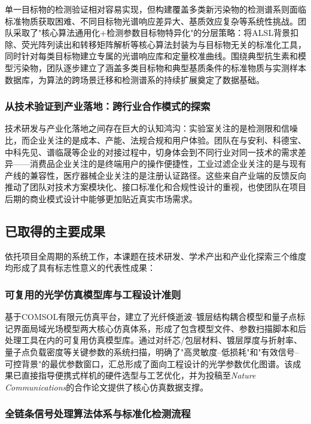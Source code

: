 \documentclass[12pt,a4paper]{article}
\begin{document}
单一目标物的检测验证相对容易实现，但构建覆盖多类新污染物的检测谱系则面临标准物质获取困难、不同目标物光谱响应差异大、基质效应复杂等系统性挑战。团队采取了"核心算法通用化+检测参数目标物特异化"的分层策略：将ALSL背景扣除、荧光阵列读出和转移矩阵解析等核心算法封装为与目标物无关的标准化工具，同时针对每类目标物建立专属的光谱响应库和定量校准曲线。围绕典型抗生素和模型污染物，团队逐步建立了涵盖多类目标物和典型基质条件的标准物质与实测样本数据库，为算法的跨场景迁移和检测谱系的持续扩展奠定了数据基础。

\subsubsection{从技术验证到产业落地：跨行业合作模式的探索}

技术研发与产业化落地之间存在巨大的认知鸿沟：实验室关注的是检测限和信噪比，而企业关注的是成本、产能、法规合规和用户体验。团队在与安利、科德宝、中科先见、谱临晟等企业的对接过程中，切身体会到不同行业对同一技术的需求差异——消费品企业关注的是终端用户的操作便捷性，工业过滤企业关注的是与现有产线的兼容性，医疗器械企业关注的是注册认证路径。这些来自产业端的反馈反向推动了团队对技术方案模块化、接口标准化和合规性设计的重视，也使团队在项目后期的商业模式设计中能够更加贴近真实市场需求。

\subsection{已取得的主要成果}

依托项目全周期的系统工作，本课题在技术研发、学术产出和产业化探索三个维度均形成了具有标志性意义的代表性成果：

\subsubsection{可复用的光学仿真模型库与工程设计准则}

基于COMSOL有限元仿真平台，建立了光纤倏逝波--镀层结构耦合模型和量子点标记界面局域光场模型两大核心仿真体系，形成了包含模型文件、参数扫描脚本和后处理工具在内的可复用仿真模型库。通过对纤芯/包层材料、镀层厚度与折射率、量子点负载密度等关键参数的系统扫描，明确了"高灵敏度--低损耗"和"有效信号--可控背景"的最优参数窗口，汇总形成了面向工程设计的光学参数优化图谱。该成果已直接指导便携式样机的硬件选型与工艺优化，并为投稿至\textit{Nature Communications}的合作论文提供了核心仿真数据支撑。

\subsubsection{全链条信号处理算法体系与标准化检测流程}
\end{document}
